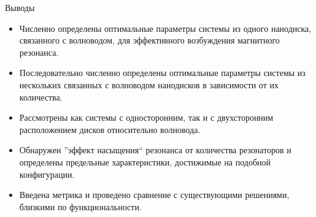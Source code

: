 \begin{frame}{Выводы}
	\begin{itemize}
		\item Численно определены оптимальные параметры системы из одного нанодиска, связанного с волноводом, для эффективного возбуждения магнитного резонанса.
		\item Последовательно численно определены оптимальные параметры системы из нескольких связанных с волноводом нанодисков в зависимости от их количества.
		\item Рассмотрены как системы с односторонним, так и с двухсторонним расположением дисков относительно волновода.
		\item Обнаружен ''эффект насыщения`` резонанса от количества резонаторов и определены предельные характеристики, достижимые на подобной конфигурации.
		\item Введена метрика и проведено сравнение с существующими решениями, близкими по функциональности. 
	\end{itemize}
\end{frame}